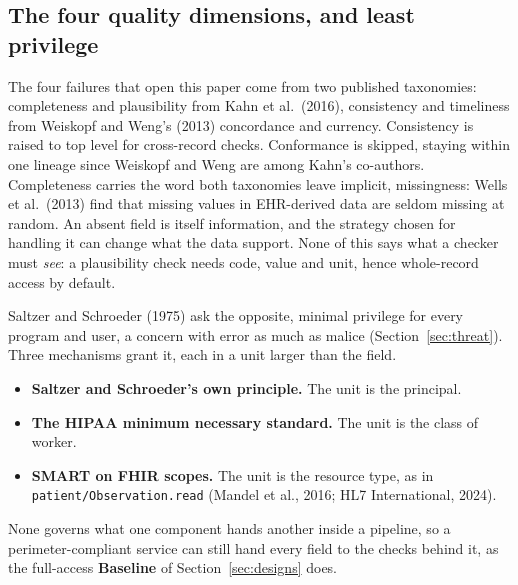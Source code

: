 \subsection{The four quality dimensions, and least privilege}

The four failures that open this paper come from two published taxonomies: completeness and
plausibility from Kahn et al.\ (2016), consistency and timeliness from Weiskopf and Weng's (2013)
concordance and currency. Consistency is raised to top level for cross-record checks. Conformance
is skipped, staying within one lineage since Weiskopf and Weng are among Kahn's co-authors.
Completeness carries the word both taxonomies leave implicit, missingness: Wells et al.\ (2013) find
that missing values in EHR-derived data are seldom missing at random. An absent field is itself
information, and the strategy chosen for handling it can change what the data support. None of this
says what a checker must \emph{see}: a plausibility check needs code, value and unit, hence
whole-record access by default.

Saltzer and Schroeder (1975) ask the opposite, minimal privilege for every program and user, a
concern with error as much as malice (Section~\ref{sec:threat}). Three mechanisms grant it, each in a
unit larger than the field.

\begin{itemize}[leftmargin=1.4em, itemsep=0.15em]
  \item \textbf{Saltzer and Schroeder's own principle.} The unit is the principal.
  \item \textbf{The HIPAA minimum necessary standard.} The unit is the class of worker.
  \item \textbf{SMART on FHIR scopes.} The unit is the resource type, as in
        \texttt{patient/Observation.read} (Mandel et al., 2016; HL7 International, 2024).
\end{itemize}

None
governs what one component hands another inside a pipeline, so a perimeter-compliant service can
still hand every field to the checks behind it, as the full-access \textbf{Baseline} of
Section~\ref{sec:designs} does.
